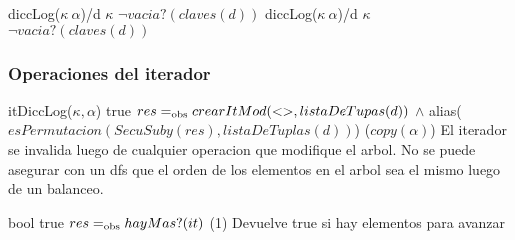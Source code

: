 {diccLog($\kappa\ \alpha$)/d}
{$\kappa$}
{$\neg vacia?(claves(d))$}
{diccLog($\kappa\ \alpha$)/d}
{$\kappa$}
{$\neg vacia?(claves(d))$}

\subsubsection{Operaciones del iterador}

{   }
{itDiccLog($\kappa, \alpha$)}
{true}
{$res =_{\mathrm{obs}} crearItMod(<>, listaDeTupas(d))$ $\land$ alias($esPermutacion(SecuSuby(res), listaDeTuplas(d))$)}
{\bigo($copy(\alpha)$)}
{El iterador se invalida luego de cualquier operacion que modifique el arbol. No se puede
    asegurar con un dfs que el orden de los elementos en el arbol sea el mismo luego de un 
    balanceo.}
{}

{    }
{bool}
{true}
{$res =_{\mathrm{obs}} hayMas?(it)$}
{\bigo(1)}
{}
{Devuelve true si hay elementos para avanzar}

